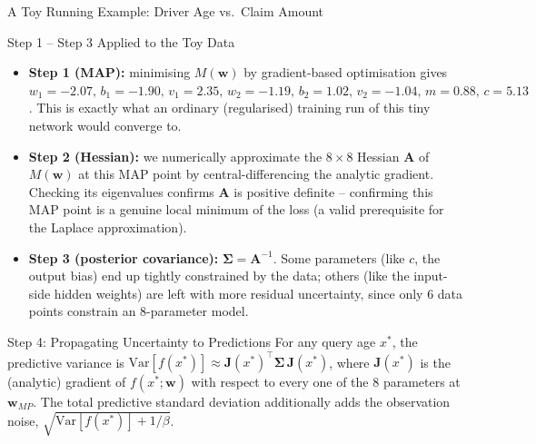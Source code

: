 \documentclass[aspectratio=169,10pt]{beamer}
\newcommand{\bw}{\mathbf{w}}
\begin{document}
\begin{frame}[allowframebreaks]{A Toy Running Example: Driver Age vs.\ Claim Amount}
  \begin{block}{Step 1 -- Step 3 Applied to the Toy Data}
    \begin{itemize}
      \item \textbf{Step 1 (MAP):} minimising $M(\bw)$ by gradient-based
        optimisation gives $w_1{=}{-}2.07,\, b_1{=}{-}1.90,\, v_1{=}2.35,\,
        w_2{=}{-}1.19,\, b_2{=}1.02,\, v_2{=}{-}1.04,\, m{=}0.88,\, c{=}5.13$.
        This is exactly what an ordinary (regularised) training run of this
        tiny network would converge to.
      \item \textbf{Step 2 (Hessian):} we numerically approximate the
        $8\times 8$ Hessian $\mathbf{A}$ of $M(\bw)$ at this MAP point by
        central-differencing the analytic gradient. Checking its
        eigenvalues confirms $\mathbf{A}$ is positive definite -- confirming
        this MAP point is a genuine local minimum of the loss (a valid
        prerequisite for the Laplace approximation).
      \item \textbf{Step 3 (posterior covariance):} $\boldsymbol{\Sigma} =
        \mathbf{A}^{-1}$. Some parameters (like $c$, the output bias) end up
        tightly constrained by the data; others (like the input-side hidden
        weights) are left with more residual uncertainty, since only 6 data
        points constrain an 8-parameter model.
    \end{itemize}
  \end{block}

  \begin{block}{Step 4: Propagating Uncertainty to Predictions}
    For any query age $x^*$, the predictive variance is
    $\mathrm{Var}[f(x^*)] \approx \mathbf{J}(x^*)^\top \boldsymbol{\Sigma}\,
    \mathbf{J}(x^*)$, where $\mathbf{J}(x^*)$ is the (analytic) gradient of
    $f(x^*;\bw)$ with respect to every one of the 8 parameters at
    $\bw_{MP}$. The total predictive standard deviation additionally adds the
    observation noise, $\sqrt{\mathrm{Var}[f(x^*)] + 1/\beta}$.
  \end{block}

\end{frame}
\end{document}
